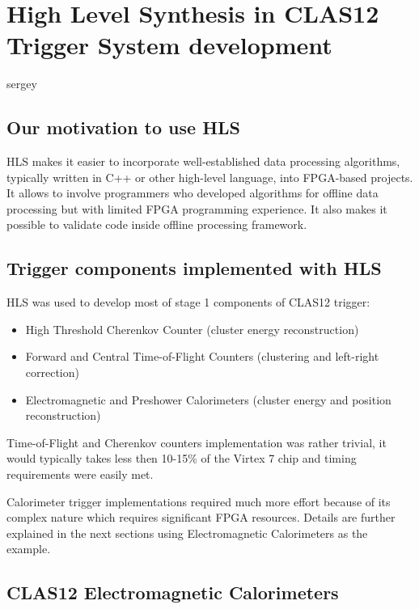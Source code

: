 \section{High Level Synthesis in CLAS12 Trigger System development} sergey

\subsection{Our motivation to use HLS}

HLS makes it easier to incorporate well-established data processing algorithms, typically written in C++ or other high-level language, into FPGA-based projects.
It allows to involve programmers who developed algorithms for offline data processing but with limited FPGA programming experience. It also makes it possible to validate code inside offline processing framework.

\subsection{Trigger components implemented with HLS}

HLS was used to develop most of stage 1 components of CLAS12 trigger:

\begin{itemize}
	\item High Threshold Cherenkov Counter (cluster energy reconstruction)
	\item Forward and Central Time-of-Flight Counters (clustering and left-right correction)
	\item Electromagnetic and Preshower Calorimeters (cluster energy and position reconstruction)
\end{itemize}

Time-of-Flight and Cherenkov counters implementation was rather trivial, it would typically takes less then 10-15\% of the Virtex 7 chip and timing requirements were easily met.

Calorimeter trigger implementations required much more effort because of its complex nature which requires significant FPGA resources. Details are further explained in the next sections using Electromagnetic Calorimeters as the example.


\subsection{CLAS12 Electromagnetic Calorimeters}

